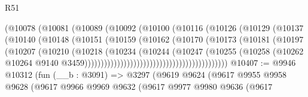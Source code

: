 \begin{lexlean}{R51}
\begin{coremodule}
                                      (@10078
                                        (@10081
                                          (@10089
                                            (@10092
                                              (@10100
                                                (@10116
                                                  (@10126
                                                    (@10129
                                                      (@10137
                                                        (@10140
                                                          (@10148
                                                            (@10151
                                                              (@10159
                                                                (@10162
                                                                  (@10170
                                                                    (@10173
                                                                      (@10181
                                                                        (@10197
                                                                          (@10207
                                                                            (@10210
                                                                              (@10218
                                                                                (@10234
                                                                                  (@10244
                                                                                    (@10247
                                                                                      (@10255
                                                                                        (@10258
                                                                                          (@10262
                                                                                            @10264
                                                                                            @9140
                                                                                            @3459))))))))))))))))))))))))))))))))))))))))))))
@10407 := @9946
    @10312
    (fun (__b : @3091) =>
    @3297
      (@9619
        @9624
        (@9617
          @9955
          @9958
          @9628
          (@9617
            @9966
            @9969
            @9632
            (@9617
              @9977
              @9980
              @9636
              (@9617

\end{coremodule}
\end{lexlean}
